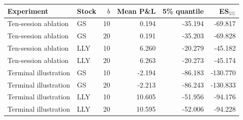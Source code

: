\begin{tabular}{llrrrr}
\toprule
Experiment & Stock & $b$ & Mean P\&L & 5\% quantile & ES$_{5\%}$ \\
\midrule
Ten-session ablation & GS & 10 & 0.194 & -35.194 & -69.817 \\
Ten-session ablation & GS & 20 & 0.191 & -35.203 & -69.828 \\
Ten-session ablation & LLY & 10 & 6.260 & -20.279 & -45.182 \\
Ten-session ablation & LLY & 20 & 6.263 & -20.273 & -45.174 \\
Terminal illustration & GS & 10 & -2.194 & -86.183 & -130.770 \\
Terminal illustration & GS & 20 & -2.213 & -86.243 & -130.833 \\
Terminal illustration & LLY & 10 & 10.605 & -51.956 & -94.176 \\
Terminal illustration & LLY & 20 & 10.595 & -52.006 & -94.228 \\
\bottomrule\end{tabular}

